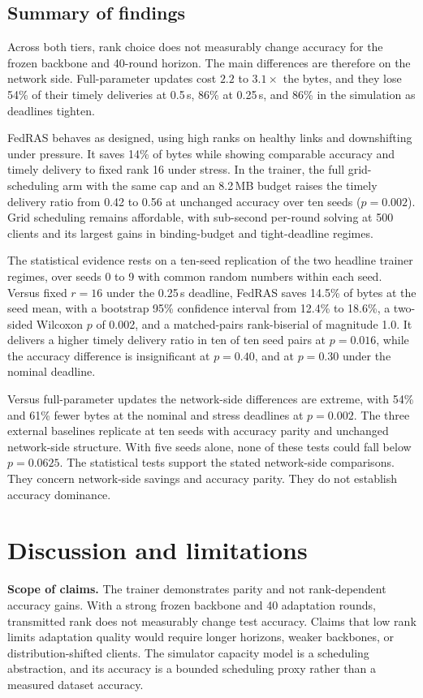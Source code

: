 \documentclass[preprint,12pt]{elsarticle}
\begin{document}
\subsection{Summary of findings}
\label{sec:summary}
Across both tiers, rank choice does not measurably change accuracy for the frozen backbone and 40-round horizon. The main differences are therefore on the network side. Full-parameter updates cost $2.2$ to $3.1\times$ the bytes, and they lose 54\% of their timely deliveries at 0.5\,s, 86\% at 0.25\,s, and 86\% in the simulation as deadlines tighten.

FedRAS behaves as designed, using high ranks on healthy links and downshifting under pressure. It saves 14\% of bytes while showing comparable accuracy and timely delivery to fixed rank 16 under stress. In the trainer, the full grid-scheduling arm with the same cap and an 8.2\,MB budget raises the timely delivery ratio from 0.42 to 0.56 at unchanged accuracy over ten seeds ($p=0.002$). Grid scheduling remains affordable, with sub-second per-round solving at 500 clients and its largest gains in binding-budget and tight-deadline regimes.

The statistical evidence rests on a ten-seed replication of the two headline trainer regimes, over seeds 0 to 9 with common random numbers within each seed. Versus fixed $r{=}16$ under the 0.25\,s deadline, FedRAS saves 14.5\% of bytes at the seed mean, with a bootstrap 95\% confidence interval from 12.4\% to 18.6\%, a two-sided Wilcoxon $p$ of 0.002, and a matched-pairs rank-biserial of magnitude 1.0. It delivers a higher timely delivery ratio in ten of ten seed pairs at $p=0.016$, while the accuracy difference is insignificant at $p=0.40$, and at $p=0.30$ under the nominal deadline.

Versus full-parameter updates the network-side differences are extreme, with 54\% and 61\% fewer bytes at the nominal and stress deadlines at $p=0.002$. The three external baselines replicate at ten seeds with accuracy parity and unchanged network-side structure. With five seeds alone, none of these tests could fall below $p=0.0625$. The statistical tests support the stated network-side comparisons. They concern network-side savings and accuracy parity. They do not establish accuracy dominance.

\section{Discussion and limitations}
\label{sec:discussion}
\textbf{Scope of claims.} The trainer demonstrates parity and not rank-dependent accuracy gains. With a strong frozen backbone and 40 adaptation rounds, transmitted rank does not measurably change test accuracy. Claims that low rank limits adaptation quality would require longer horizons, weaker backbones, or distribution-shifted clients. The simulator capacity model is a scheduling abstraction, and its accuracy is a bounded scheduling proxy rather than a measured dataset accuracy.
\end{document}
